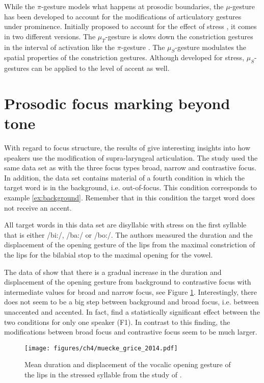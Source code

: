 While the $\pi$-gesture models what happens at prosodic boundaries, the $\mu$-ges\-ture has been developed to account for the modifications of articulatory gestures under prominence. Initially proposed to account for the effect of stress \citep{Saltzmanetal2008}, it comes in two different versions. The $\mu_T$-gesture is slows down the constriction gestures in the interval of activation like the $\pi$-gesture \citep{Krivokapic2014}. The $\mu_S$-gesture modulates the spatial properties of the constriction gestures. Although developed for stress, $\mu_S$-gestures can be applied to the level of accent as well.

\section{Prosodic focus marking beyond tone}
\label{sec:focus3}

With regard to focus structure, the results of \citet{MückeGrice2014} give interesting insights into how speakers use the modification of supra-laryngeal articulation. The study used the same data set as \citet{Griceetal2017} with the three focus types broad, narrow and contrastive focus. In addition, the data set contains material of a fourth condition in which the target word is in the background, i.e. out-of-focus. This condition corresponds to example \ref{ex:background}. Remember that in this condition the target word does not receive an accent. 

All target words in this data set are disyllabic with stress on the first syllable that is either /bi:/, /ba:/ or /bo:/. The authors measured the duration and the displacement of the opening gesture of the lips from the maximal constriction of the lips for the bilabial stop to the maximal opening for the vowel.

The data of \citet{MückeGrice2014} show that there is a gradual increase in the duration and displacement of the opening gesture from background to contrastive focus with intermediate values for broad and narrow focus, see Figure \ref{fig:muecke_grice_2014}. Interestingly, there does not seem to be a big step between background and broad focus, i.e. between unaccented and accented. In fact, \citet{MückeGrice2014} find a statistically significant effect between the two conditions for only one speaker (F1). In contrast to this finding, the modifications between broad focus and contrastive focus seem to be much larger. 

\begin{figure}
\texttt{[image: figures/ch4/muecke\_grice\_2014.pdf]}
\caption{Mean duration and displacement of the vocalic opening gesture of the lips in the stressed syllable from the study of \citet{MückeGrice2014}.}
\label{fig:muecke_grice_2014}
\end{figure}

